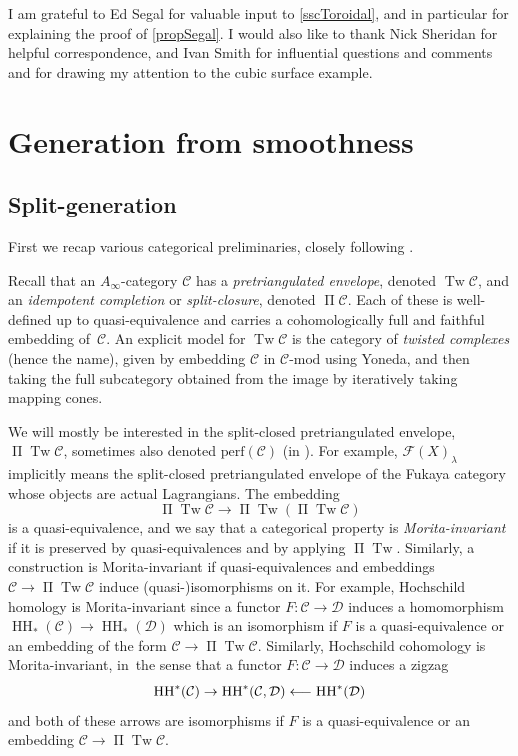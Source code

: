 \documentclass[JEP,XML,SOM,Unicode,NoEqCountersInSection,NoFloatCountersInSection,published]{cedram}
\newcommand\from{\mathchoice{\longleftarrow}{\leftarrow}{\leftarrow}{\leftarrow}}
\theoremstyle{definition}
\newcommand{\calC}{\mathcal{C}}
\newcommand{\calD}{\mathcal{D}}
\newcommand{\Fuk}{\mathcal{F}}
\newcommand{\HH}{\operatorname{HH}}
\newcommand{\Tw}{\operatorname{Tw}}
\newcommand{\oPi}{\operatorname{\Pi}}
\newcommand{\PiTw}{\oPi \Tw}
\begin{document}
I am grateful to Ed Segal for valuable input to \cref{sscToroidal}, and in particular for explaining the proof of \cref{propSegal}. I would also like to thank Nick Sheridan for helpful correspondence, and Ivan Smith for influential questions and comments and for drawing my attention to the cubic surface example.

\section{Generation from smoothness}
\label{secGeneration}

\subsection{Split-generation}
\label{sscGeneration}

First we recap various categorical preliminaries, closely following \cite{GanatraAutomaticGeneration}.

Recall that an $A_\infty$-category $\calC$ has a \emph{pretriangulated envelope}, denoted $\Tw \calC$, and an \emph{idempotent completion} or \emph{split-closure}, denoted $\oPi \calC$. Each of these is well-defined up to quasi-equivalence and carries a cohomologically full and faithful embedding of~$\calC$. An explicit model for $\Tw \calC$ is the category of \emph{twisted complexes} (hence the name), given by embedding $\calC$ in $\calC\text{-mod}$ using Yoneda, and then taking the full subcategory obtained from the image by iteratively taking mapping cones.

We will mostly be interested in the split-closed pretriangulated envelope, $\PiTw \calC$, sometimes also denoted $\mathrm{perf}(\calC)$ (\eg in \cite{GanatraAutomaticGeneration}). For example, $\Fuk(X)_\lambda$ implicitly means the split-closed pretriangulated envelope of the Fukaya category whose objects are actual Lagrangians. The embedding
\[
\PiTw \calC \to \PiTw(\PiTw\calC)
\]
is a quasi-equivalence, and we say that a categorical property is \emph{Morita-invariant} if it is preserved by quasi-equivalences and by applying $\PiTw$. Similarly, a construction is Morita-invariant if quasi-equivalences and embeddings $\calC \to \PiTw \calC$ induce (quasi\nobreakdash-)isomorphisms on it. For example, Hochschild homology is Morita-invariant since a functor $F : \calC \to \calD$ induces a homomorphism $\HH_*(\calC) \to \HH_*(\calD)$ which is an isomorphism if $F$ is a quasi-equivalence or an embedding of the form $\calC \to \PiTw \calC$. Similarly, Hochschild cohomology is Morita-invariant, in~the sense that a functor $F : \calC \to \calD$ induces a zigzag
\begin{equation}
\label{eqHHmaps}
\HH^*(\calC) \to \HH^*(\calC, \calD) \from \HH^*(\calD)
\end{equation}
and both of these arrows are isomorphisms if $F$ is a quasi-equivalence or an embedding $\calC \to \PiTw \calC$.
\end{document}
